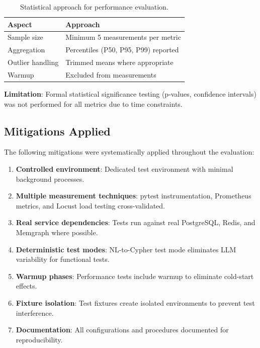 \begin{table}[ht]
\centering
\caption{Statistical approach for performance evaluation.}
\label{tab:statistical-approach}
\small
\begin{tabular}{ll}
\hline
\textbf{Aspect} & \textbf{Approach} \\
\hline
Sample size & Minimum 5 measurements per metric \\
Aggregation & Percentiles (P50, P95, P99) reported \\
Outlier handling & Trimmed means where appropriate \\
Warmup & Excluded from measurements \\
\hline
\end{tabular}
\end{table}

\textbf{Limitation}: Formal statistical significance testing (p-values, confidence intervals) was not performed for all metrics due to time constraints.

\subsection{Mitigations Applied}

The following mitigations were systematically applied throughout the evaluation:

\begin{enumerate}
    \item \textbf{Controlled environment}: Dedicated test environment with minimal background processes.
    
    \item \textbf{Multiple measurement techniques}: pytest instrumentation, Prometheus metrics, and Locust load testing cross-validated.
    
    \item \textbf{Real service dependencies}: Tests run against real PostgreSQL, Redis, and Memgraph where possible.
    
    \item \textbf{Deterministic test modes}: NL-to-Cypher test mode eliminates LLM variability for functional tests.
    
    \item \textbf{Warmup phases}: Performance tests include warmup to eliminate cold-start effects.
    
    \item \textbf{Fixture isolation}: Test fixtures create isolated environments to prevent test interference.
    
    \item \textbf{Documentation}: All configurations and procedures documented for reproducibility.
\end{enumerate}

